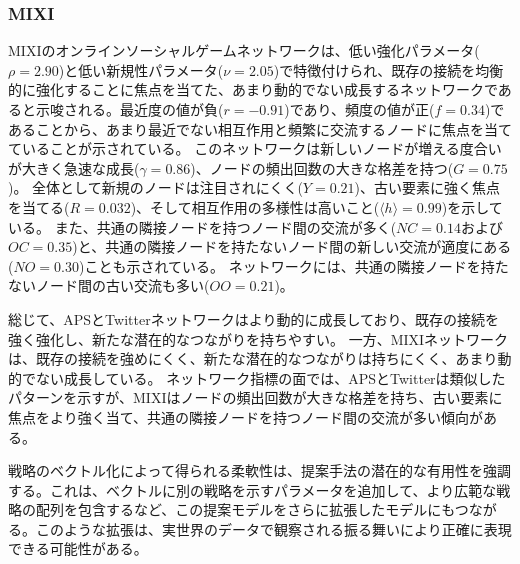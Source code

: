 \documentclass[uplatex,11pt,openany]{ujreport}
\begin{document}
            \subsubsection*{MIXI}
            MIXIのオンラインソーシャルゲームネットワークは、低い強化パラメータ($\rho = 2.90$)と低い新規性パラメータ($\nu = 2.05$)で特徴付けられ、既存の接続を均衡的に強化することに焦点を当てた、あまり動的でない成長するネットワークであると示唆される。最近度の値が負($r = -0.91$)であり、頻度の値が正($f = 0.34$)であることから、あまり最近でない相互作用と頻繁に交流するノードに焦点を当てていることが示されている。
            このネットワークは新しいノードが増える度合いが大きく急速な成長($\gamma = 0.86$)、ノードの頻出回数の大きな格差を持つ($G = 0.75$)。
            全体として新規のノードは注目されにくく($Y = 0.21$)、古い要素に強く焦点を当てる($R = 0.032$)、そして相互作用の多様性は高いこと($\langle h \rangle = 0.99$)を示している。
            また、共通の隣接ノードを持つノード間の交流が多く($NC = 0.14$および$OC = 0.35$)と、共通の隣接ノードを持たないノード間の新しい交流が適度にある($NO = 0.30$)ことも示されている。
            ネットワークには、共通の隣接ノードを持たないノード間の古い交流も多い($OO = 0.21$)。

            総じて、APSとTwitterネットワークはより動的に成長しており、既存の接続を強く強化し、新たな潜在的なつながりを持ちやすい。
            一方、MIXIネットワークは、既存の接続を強めにくく、新たな潜在的なつながりは持ちにくく、あまり動的でない成長している。
            ネットワーク指標の面では、APSとTwitterは類似したパターンを示すが、MIXIはノードの頻出回数が大きな格差を持ち、古い要素に焦点をより強く当て、共通の隣接ノードを持つノード間の交流が多い傾向がある。

            戦略のベクトル化によって得られる柔軟性は、提案手法の潜在的な有用性を強調する。これは、ベクトルに別の戦略を示すパラメータを追加して、より広範な戦略の配列を包含するなど、この提案モデルをさらに拡張したモデルにもつながる。このような拡張は、実世界のデータで観察される振る舞いにより正確に表現できる可能性がある。
\end{document}
